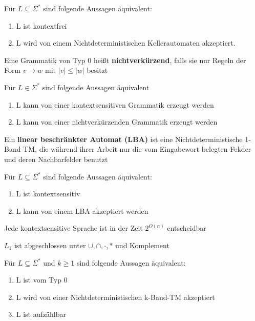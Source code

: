\documentclass[14pt]{article}
\begin{document}
\begin{eigenschaft}
    Für $L \subseteq \varSigma^*$ sind folgende Aussagen äquivalent:
    \begin{enumerate}
        \item L ist kontextfrei
        \item L wird von einem Nichtdeterministischen Kellerautomaten
        akzeptiert.
    \end{enumerate}
\end{eigenschaft}
\begin{definition} 
    Eine Grammatik von Typ 0 heißt \textbf{nichtverkürzend}, falls sie nur Regeln
    der Form $v \rightarrow w$ mit $|v| \leq |w|$ besitzt
\end{definition}
\begin{eigenschaft}
    Für $L \in \varSigma^*$ sind folgende Aussagen äquivalent
    \begin{enumerate}
        \item L kann von einer kontextsensitiven Grammatik erzeugt werden
        \item L kann von einer nichtverkürzenden Grammatik erzeugt werden
    \end{enumerate}
\end{eigenschaft}
\begin{definition}
    Ein \textbf{linear beschränkter Automat (LBA)} ist eine Nichtdeterministische
    1-Band-TM, die während ihrer Arbeit nur die vom Eingabewort belegten Fekder
    und deren Nachbarfelder benutzt
\end{definition}
\begin{eigenschaft}
    Für $L \subseteq \varSigma^*$ sind folgende Aussagen äquivalent:
    \begin{enumerate}
        \item L ist kontextsensitiv
        \item L kann von einem LBA akzeptiert werden
    \end{enumerate}
\end{eigenschaft}
\begin{eigenschaft}
    Jede kontextsensitive Sprache ist in der Zeit $2^{O(n)}$ entscheidbar
\end{eigenschaft}
\begin{eigenschaft}
    $L_1$ ist abgeschlossen unter $\cup, \cap, \cdot,*$ und Komplement 
\end{eigenschaft}
\begin{eigenschaft}
    Für $L \subseteq \varSigma^*$ und $k \geq 1$ sind folgende Aussagen äquivalent:
    \begin{enumerate}
        \item L ist vom Typ 0
        \item L wird von einer Nichtdeterministischen k-Band-TM akzeptiert
        \item L ist aufzählbar
    \end{enumerate}
\end{eigenschaft}
\end{document}
